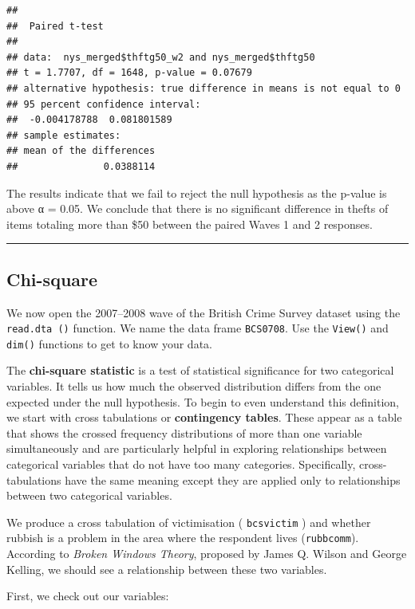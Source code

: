 \documentclass[
]{book}
\begin{document}
\begin{verbatim}
## 
##  Paired t-test
## 
## data:  nys_merged$thftg50_w2 and nys_merged$thftg50
## t = 1.7707, df = 1648, p-value = 0.07679
## alternative hypothesis: true difference in means is not equal to 0
## 95 percent confidence interval:
##  -0.004178788  0.081801589
## sample estimates:
## mean of the differences 
##               0.0388114
\end{verbatim}

The results indicate that we fail to reject the null hypothesis as the p-value is above α = 0.05. We conclude that there is no significant difference in thefts of items totaling more than \$50 between the paired Waves 1 and 2 responses.

\begin{center}\rule{0.5\linewidth}{0.5pt}\end{center}

\hypertarget{chi-square}{%
\subsection{Chi-square}\label{chi-square}}

We now open the 2007--2008 wave of the British Crime Survey dataset using the \texttt{read.dta\ ()} function. We name the data frame \texttt{BCS0708}. Use the \texttt{View()} and \texttt{dim()} functions to get to know your data.

The \textbf{chi-square statistic} is a test of statistical significance for two categorical variables. It tells us how much the observed distribution differs from the one expected under the null hypothesis. To begin to even understand this definition, we start with cross tabulations or \textbf{contingency tables}. These appear as a table that shows the crossed frequency distributions of more than one variable simultaneously and are particularly helpful in exploring relationships between categorical variables that do not have too many categories. Specifically, cross-tabulations have the same meaning except they are applied only to relationships between two categorical variables.

We produce a cross tabulation of victimisation ( \texttt{bcsvictim} ) and whether rubbish is a problem in the area where the respondent lives (\texttt{rubbcomm}). According to \emph{Broken Windows Theory}, proposed by James Q. Wilson and George Kelling, we should see a relationship between these two variables.

First, we check out our variables:
\end{document}
